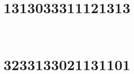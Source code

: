 \,
\newline
\vspace{1.2cm}

\section{1313033311121313}

\marginnote[3\baselineskip]{\centering}



\,
\newline
\vspace{1.2cm}

\section{3233133021131101}

\marginnote[3\baselineskip]{\centering}



\,
\newline
\vspace{1.2cm}
